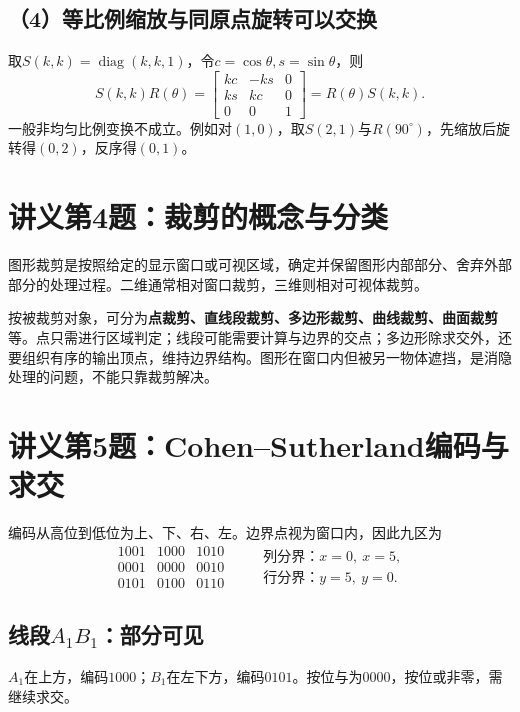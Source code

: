 \subsection*{（4）等比例缩放与同原点旋转可以交换}
取$S(k,k)=\operatorname{diag}(k,k,1)$，令$c=\cos\theta,s=\sin\theta$，则
\[
S(k,k)R(\theta)=
\begin{bmatrix}kc&-ks&0\\ks&kc&0\\0&0&1\end{bmatrix}
=R(\theta)S(k,k).
\]
一般非均匀比例变换不成立。例如对$(1,0)$，取$S(2,1)$与$R(90^\circ)$，先缩放后旋转得$(0,2)$，反序得$(0,1)$。

\section{讲义第4题：裁剪的概念与分类}
\sol 图形裁剪是按照给定的显示窗口或可视区域，确定并保留图形内部部分、舍弃外部部分的处理过程。二维通常相对窗口裁剪，三维则相对可视体裁剪。

按被裁剪对象，可分为\textbf{点裁剪、直线段裁剪、多边形裁剪、曲线裁剪、曲面裁剪}等。点只需进行区域判定；线段可能需要计算与边界的交点；多边形除求交外，还要组织有序的输出顶点，维持边界结构。图形在窗口内但被另一物体遮挡，是消隐处理的问题，不能只靠裁剪解决。

\section{讲义第5题：Cohen--Sutherland编码与求交}
\sol 编码从高位到低位为上、下、右、左。边界点视为窗口内，因此九区为
\[
\begin{array}{c|c|c}
1001&1000&1010\\\hline
0001&0000&0010\\\hline
0101&0100&0110
\end{array}
\qquad
\begin{array}{l}
\text{列分界：}x=0,\ x=5,\\
\text{行分界：}y=5,\ y=0.
\end{array}
\]

\subsection*{线段$A_1B_1$：部分可见}
$A_1$在上方，编码$1000$；$B_1$在左下方，编码$0101$。按位与为$0000$，按位或非零，需继续求交。


